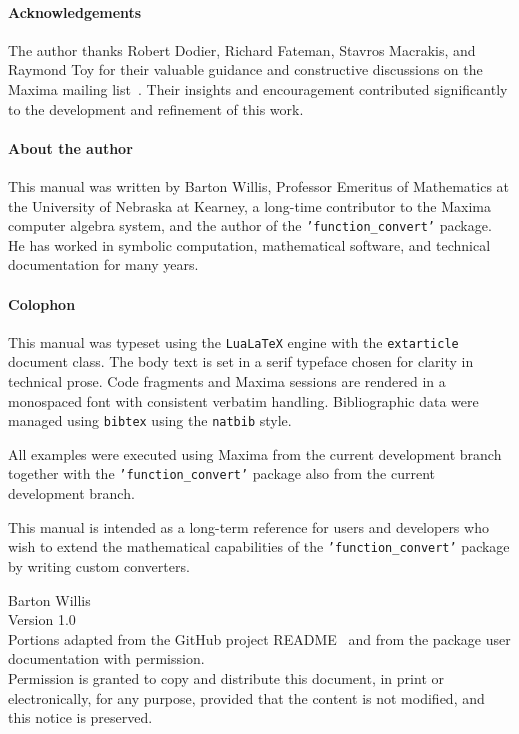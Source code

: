 \documentclass[12pt,fleqn]{extarticle}
\newcommand{\ttq}[1]{\texttt{'#1'}}
\newcommand{\funconvert}{\ttq{function\_convert}{ }}
\begin{document}
\paragraph*{Acknowledgements} The author thanks Robert Dodier, Richard Fateman, Stavros Macrakis, and Raymond Toy for their valuable guidance and constructive discussions on
the Maxima mailing list~\cite{maxima-list}. Their insights and
encouragement contributed significantly to the development and
refinement of this work.




%


\clearpage




\paragraph*{About the author}
This manual was written by Barton Willis, Professor Emeritus of Mathematics at the University of Nebraska at Kearney, a long-time contributor to the Maxima computer algebra system, and the author of the \funconvert package. He has worked in symbolic computation, mathematical software, and technical documentation for many years.


\paragraph*{Colophon} This manual was typeset using the \texttt{LuaLaTeX}  engine with the
\texttt{extarticle} document class. The body text is set in a serif typeface chosen for
clarity in technical prose. Code fragments and Maxima sessions
are rendered in a monospaced font with consistent verbatim handling. Bibliographic data were managed using \texttt{bibtex} using the \texttt{natbib} style.

All examples were executed using Maxima from the current development branch together with the \funconvert package also from the current development branch.

This manual is intended as a long-term reference for users and
developers who wish to extend the mathematical capabilities of the
\funconvert package by writing custom converters.

\begin{flushleft}
 Barton Willis\\
Version 1.0\\
Portions adapted from the GitHub project README~\cite{willis-function-convert} and from the package
user documentation with permission.\\[1ex]
Permission is granted to copy and distribute this document, in print or electronically, for any purpose, provided that the content is not
 modified, and this notice is preserved.
\end{flushleft}
\end{document}
